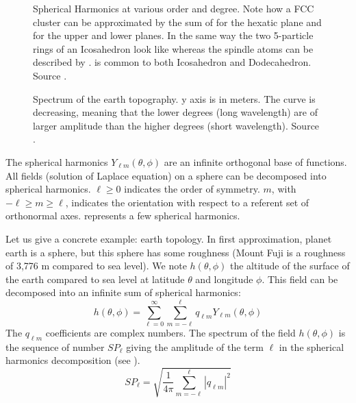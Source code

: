 \begin{figure}
	\caption{Spherical Harmonics at various order and degree. Note how a \acs{FCC} cluster can be approximated by the sum of  for the hexatic plane and  for the upper and lower planes. In the same way the two 5-particle rings of an Icosahedron look like  whereas the spindle atoms can be described by .  is common to both Icosahedron and Dodecahedron. Source .}
	\label{fig:SphericalHarmonics}
\end{figure}

\begin{figure}
	\centering
	\def\svgwidth{0.6\textwidth}
	\caption{Spectrum of the earth topography. y axis is in meters. The curve is decreasing, meaning that the lower degrees (long wavelength) are of larger amplitude than the higher degrees (short wavelength). Source .}
	\label{fig:earth_spectrum}
\end{figure}

The spherical harmonics $Y_{\ell m}(\theta,\phi)$ are an infinite orthogonal base of functions. All fields (solution of Laplace equation) on a sphere can be decomposed into spherical harmonics. $\ell \geq 0$ indicates the order of symmetry. $m$, with $-\ell \geq m \geq \ell$, indicates the orientation with respect to a referent set of orthonormal axes.  represents a few spherical harmonics.

Let us give a concrete example: earth topology. In first approximation, planet earth is a sphere, but this sphere has some roughness (Mount Fuji is a roughness of 3,776 m compared to sea level). We note $h(\theta,\phi)$ the altitude of the surface of the earth compared to sea level at latitude $\theta$ and longitude $\phi$. This field can be decomposed into an infinite sum of spherical harmonics:
\begin{equation} 
h(\theta,\phi) = \sum_{\ell=0}^{\infty} \sum_{m=-\ell}^{\ell} q_{\ell m} Y_{\ell m}(\theta,\phi)
\end{equation}
The $q_{\ell m}$ coefficients are complex numbers. The spectrum of the field $h(\theta,\phi)$ is the sequence of number $SP_\ell$ giving the amplitude of the term $\ell$ in the spherical harmonics decomposition (see ).
\begin{equation} 
	SP_\ell = \sqrt{\frac{1}{4\pi} \sum_{m=-\ell}^{\ell} |q_{\ell m}|^2 } 
\end{equation}

